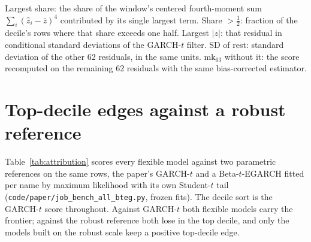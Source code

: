 \documentclass[11pt]{article}
\begin{document}
\begin{table}[htbp]
\begin{threeparttable}
\begin{tabular}{lcccccc}
\end{tabular}
\begin{tablenotes}\footnotesize
\item Largest share: the share of the window's centered fourth-moment sum $\sum_i(\widehat z_i-\bar z)^4$ contributed by its single largest term. Share $>\tfrac12$: fraction of the decile's rows where that share exceeds one half. Largest $|z|$: that residual in conditional standard deviations of the GARCH-$t$ filter. SD of rest: standard deviation of the other 62 residuals, in the same units. $\mathrm{mk}_{63}$ without it: the score recomputed on the remaining 62 residuals with the same bias-corrected estimator.
\end{tablenotes}
\end{threeparttable}
\end{table}

\section{Top-decile edges against a robust reference}
Table~\ref{tab:attribution} scores every flexible model against two parametric references on the same rows, the paper's GARCH-$t$ and a Beta-$t$-EGARCH \citep{harvey2013dynamic} fitted per name by maximum likelihood with its own Student-$t$ tail (\texttt{code/paper/job\_bench\_all\_bteg.py}, frozen fits). The decile sort is the GARCH-$t$ score throughout. Against GARCH-$t$ both flexible models carry the frontier; against the robust reference both lose in the top decile, and only the models built on the robust scale keep a positive top-decile edge.
\end{document}
